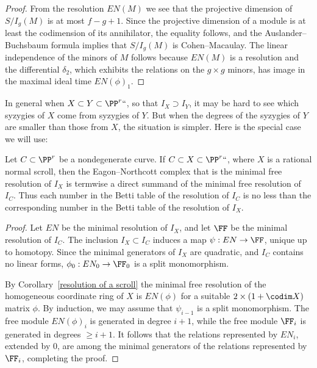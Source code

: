 \begin{proof}
From the resolution $EN(M)$ we see that the projective dimension of
$S/I_g(M)$ is at most $f-g+1$. Since the projective dimension of a module
is at least the codimension of its annihilator, the equality follows,
and the Auslander--Buchsbaum formula implies that $S/I_g(M)$ is
%
%
Cohen--Macaulay. The linear independence of the minors of $M$ follows
because $EN(M)$ is a resolution and the differential $\delta_{2}$, which 
exhibits the relations on the $g\times g$ minors, has image in the
maximal ideal time $EN(\phi)_{1}$.
\end{proof}

In general when $X\subset Y\subset \PP^r` `$, so that $I_X \supset I_Y$,
it may be hard to see which syzygies of $X$ come
from syzygies of $Y$. But when the degrees of the syzygies of $Y$ are
smaller than those from $X$, the situation is simpler.
Here is the special case we will use:

\begin{proposition}\label{containment of resolutions}
Let $C\subset \PP^r$ be
a nondegenerate curve. If $C\subset X
\subset \PP^r` `$, where $X$ is a rational
%
normal scroll, then the Eagon--Northcott complex that is  the minimal
free resolution of $I_X$ is termwise a direct summand
of the minimal free resolution of $I_C$. Thus each number in the Betti table of the
%
resolution of $I_C$ is  
no less than
the corresponding number in the Betti table of the resolution of $I_X$.
\unif
\end{proposition}

\begin{proof}
Let $EN$ be the minimal resolution of $I_X$, and let $\FF$ be the minimal
resolution of $I_C$.
The inclusion $I_X \subset I_C$ induces a map $\psi: EN\to \FF$, unique
up to homotopy. Since the minimal generators of $I_X$ are quadratic,
and $I_C$ contains no linear forms, $\phi_0: EN_0\to \FF_0$ is a split
monomorphism.

By Corollary~\ref{resolution of a scroll} the minimal free resolution of the homogeneous
coordinate ring of $X$ is $EN(\phi)$ for a suitable $2\times (1+\codim X)$ matrix $\phi$.
By induction, we may assume that $\psi_{i-1}$ is a split monomorphism. The
free module $EN(\phi)_{i}$ is generated in
degree $i+1$, while the free module $\FF_i$ is generated in degrees
$\geq i+1$. It follows that the relations
represented by $EN_i$, extended by 0, are among the minimal generators
of the relations represented by $\FF_i$,
completing the proof.
\end{proof}


